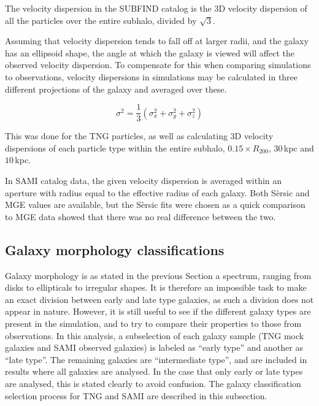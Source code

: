 The velocity dispersion in the SUBFIND catalog is the 3D velocity dispersion of all the particles over the entire subhalo, divided by $\sqrt{3}$. %

Assuming that velocity dispersion tends to fall off at larger radii, and the galaxy has an ellipsoid shape, the angle at which the galaxy is viewed will affect the observed velocity dispersion. To compensate for this when comparing simulations to observations, velocity dispersions in simulations may be calculated in three different projections of the galaxy and averaged over these. 

\begin{equation} \label{sigma1}
    \sigma^{2} = \frac{1}{3}(\sigma_x^2 + \sigma_y^2 + \sigma_z^2)
\end{equation}

This was done for the TNG particles, as well as calculating 3D velocity dispersions of each particle type within the entire subhalo, $0.15 \times R_{200}$, $30\,$kpc and $10\,$kpc.

In SAMI catalog data, the given velocity dispersion is averaged within an aperture with radius equal to the effective radius of each galaxy. Both Sèrsic and MGE values are available, but the Sèrsic fits were chosen as a quick comparison to MGE data showed that there was no real difference between the two.

\subsection{Galaxy morphology classifications}

Galaxy morphology is as stated in the previous Section a spectrum, ranging from disks to ellipticals to irregular shapes. It is therefore an impossible task to make an exact division between early and late type galaxies, as such a division does not appear in nature. However, it is still useful to see if the different galaxy types are present in the simulation, and to try to compare their properties to those from observations. In this analysis, a subselection of each galaxy sample (TNG mock galaxies and SAMI observed galaxies) is labeled as ``early type'' and another as ``late type''. The remaining galaxies are ``intermediate type'', and are included in results where all galaxies are analysed. In the case that only early or late types are analysed, this is stated clearly to avoid confusion. The galaxy classification selection process for TNG and SAMI are described in this subsection.

